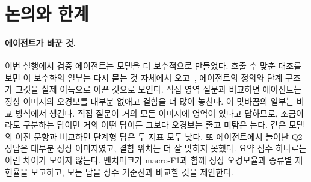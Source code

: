 \documentclass[11pt]{article}
\begin{document}
\section{논의와 한계}
\paragraph{에이전트가 바꾼 것.} 이번 실행에서 검증 에이전트는 모델을 더 보수적으로 만들었다. 호출 수 맞춘 대조를 보면 이 보수화의 일부는 다시 묻는 것 자체에서 오고~\cite{huang2024cannotselfcorrect}, 에이전트의 정의와 단계 구조가 그것을 실제 이득으로 이끈 것으로 보인다. 직접 영역 질문과 비교하면 에이전트는 정상 이미지의 오경보를 대부분 없애고 결함을 더 많이 놓친다. 이 맞바꿈의 일부는 비교 방식에서 생긴다. 직접 질문이 거의 모든 이미지에 영역이 있다고 답하므로, 조금이라도 구분하는 답이면 거의 어떤 답이든 그보다 오경보는 줄고 미탐은 는다. 같은 모델의 이진 문항과 비교하면 단계형 답은 두 지표 모두 낫다. 또 에이전트에서 늘어난 Q2 정답은 대부분 정상 이미지였고, 결함 위치는 더 잘 맞히지 못했다. 요약 점수 하나로는 이런 차이가 보이지 않는다. 벤치마크가 macro-F1과 함께 정상 오경보율과 종류별 재현율을 보고하고, 모든 답을 상수 기준선과 비교할 것을 제안한다.
\end{document}
